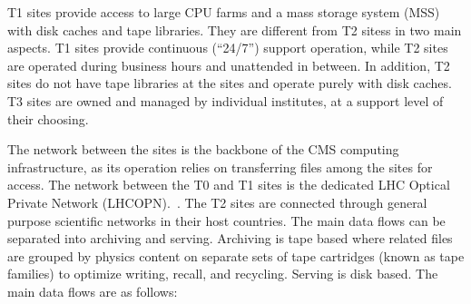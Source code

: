 T1 sites provide access to large CPU farms and a mass storage system
(MSS) with disk caches and tape libraries. They are different from T2
sitess in two main aspects. T1 sites provide continuous (``24/7'')
support operation, while T2 sites are operated during business hours
and unattended in between. In addition, T2 sites do not have tape
libraries at the sites and operate purely with disk caches.  T3 sites
are owned and managed by individual institutes, at a support level of their
choosing.

The network between the sites is the backbone of the CMS computing
infrastructure, as its operation relies on transferring files among the
sites for access. The network between the T0 and T1 sites is the dedicated
LHC Optical Private Network (LHCOPN).~. The T2 sites are connected through general purpose
scientific networks in their host countries. The main data flows can be
separated into archiving and serving. Archiving is tape based where related
files are grouped by physics content on separate sets of tape cartridges
(known as tape families) to optimize writing, recall, and
recycling. Serving is disk based. The main data flows are as follows:
